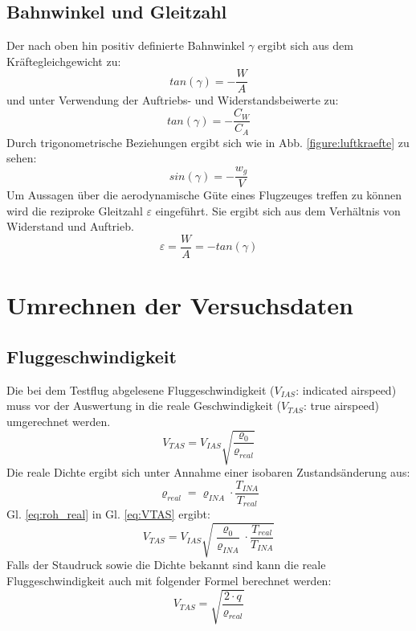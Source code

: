 \subsection{Bahnwinkel und Gleitzahl}
Der nach oben hin positiv definierte Bahnwinkel $\gamma$ ergibt sich aus dem Kräftegleichgewicht zu:
\begin{equation}
tan(\gamma)=-\frac{W}{A}
\end{equation}
und unter Verwendung der Auftriebs- und Widerstandsbeiwerte zu:
\begin{equation}
tan(\gamma)=-\frac{C_W}{C_A}
\end{equation}
Durch trigonometrische Beziehungen ergibt sich wie in Abb. \ref{figure:luftkraefte} zu sehen:
\begin{equation}
\label{eq:bahnneigungswinkel}
sin(\gamma) = -\frac{w_g}{V}
\end{equation}
%
%
%
%
Um Aussagen über die aerodynamische Güte eines Flugzeuges treffen zu können wird die reziproke Gleitzahl $\varepsilon$ eingeführt. Sie ergibt sich aus dem Verhältnis von Widerstand und Auftrieb.
\begin{equation}
\varepsilon=\frac{W}{A}=-tan(\gamma)
\end{equation}
%

\section{Umrechnen der Versuchsdaten}
\subsection{Fluggeschwindigkeit}
Die bei dem Testflug abgelesene Fluggeschwindigkeit ($V_{IAS}$: indicated airspeed) muss vor der Auswertung in die reale Geschwindigkeit ($V_{TAS}$: true airspeed) umgerechnet werden.
\begin{equation} \label{eq:VTAS}
V_{TAS}=V_{IAS} \sqrt{\frac{\varrho_0}{\varrho_{real}}}
\end{equation} 
Die reale Dichte ergibt sich unter Annahme einer isobaren Zustandsänderung aus:
\begin{equation} \label{eq:roh_real}
\varrho_{real} = \varrho_{INA}  \cdot  \frac{T_{INA}}{T_{real}}
\end{equation}
Gl. \ref{eq:roh_real} in Gl. \ref{eq:VTAS} ergibt:
\begin{equation}
V_{TAS}=V_{IAS} \sqrt{\frac{\varrho_0}{\varrho_{INA}} \cdot \frac{T_{real}}{T_{INA}}}
\end{equation}
Falls der Staudruck sowie die Dichte bekannt sind kann die reale Fluggeschwindigkeit auch mit folgender Formel berechnet werden:
\begin{equation} \label{eq:vüberq}
V_{TAS} = \sqrt{\frac{2 \cdot q}{\varrho_{real}}}
\end{equation}
%
\vspace{10mm}
